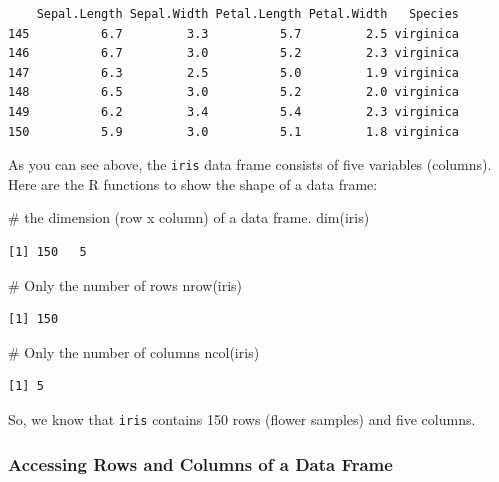 \documentclass[
  letterpaper,
  DIV=11,
  numbers=noendperiod]{scrreprt}
\newenvironment{Shaded}{\begin{snugshade}}{\end{snugshade}}
\newcommand{\CommentTok}[1]{\textcolor[rgb]{0.37,0.37,0.37}{#1}}
\newcommand{\FunctionTok}[1]{\textcolor[rgb]{0.28,0.35,0.67}{#1}}
\newcommand{\NormalTok}[1]{\textcolor[rgb]{0.00,0.23,0.31}{#1}}
\begin{document}
\begin{verbatim}
    Sepal.Length Sepal.Width Petal.Length Petal.Width   Species
145          6.7         3.3          5.7         2.5 virginica
146          6.7         3.0          5.2         2.3 virginica
147          6.3         2.5          5.0         1.9 virginica
148          6.5         3.0          5.2         2.0 virginica
149          6.2         3.4          5.4         2.3 virginica
150          5.9         3.0          5.1         1.8 virginica
\end{verbatim}

As you can see above, the \texttt{iris} data frame consists of five
variables (columns). Here are the R functions to show the shape of a
data frame:

\begin{Shaded}
\begin{Highlighting}[]
\CommentTok{\# the dimension (row x column) of a data frame.}
\FunctionTok{dim}\NormalTok{(iris)}
\end{Highlighting}
\end{Shaded}

\begin{verbatim}
[1] 150   5
\end{verbatim}

\begin{Shaded}
\begin{Highlighting}[]
\CommentTok{\# Only the number of rows}
\FunctionTok{nrow}\NormalTok{(iris)}
\end{Highlighting}
\end{Shaded}

\begin{verbatim}
[1] 150
\end{verbatim}

\begin{Shaded}
\begin{Highlighting}[]
\CommentTok{\# Only the number of columns}
\FunctionTok{ncol}\NormalTok{(iris)}
\end{Highlighting}
\end{Shaded}

\begin{verbatim}
[1] 5
\end{verbatim}

So, we know that \texttt{iris} contains 150 rows (flower samples) and
five columns.

\subsubsection{Accessing Rows and Columns of a Data
Frame}\label{sec-01-access-rows-columns}
\end{document}
